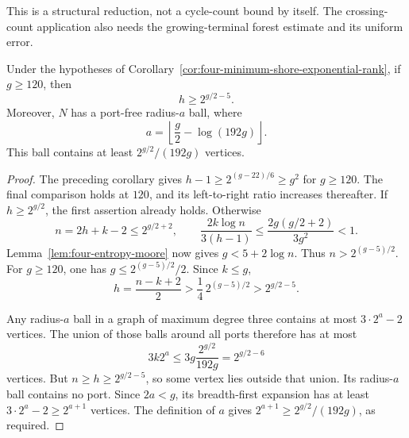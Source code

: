 This is a structural reduction, not a cycle-count bound by itself.
The crossing-count application also needs the growing-terminal forest estimate and its uniform error.

\begin{corollary}
\label{cor:four-near-moore-shore-rank}
Under the hypotheses of Corollary~\ref{cor:four-minimum-shore-exponential-rank}, if $g\ge120$, then
\[
 h\ge2^{g/2-5}.
\]
Moreover, $N$ has a port-free radius-$a$ ball, where
\[
 a=\left\lfloor\frac g2-\log(192g)\right\rfloor.
\]
This ball contains at least $2^{g/2}/(192g)$ vertices.
\end{corollary}

\begin{proof}
The preceding corollary gives $h-1\ge2^{(g-22)/6}\ge g^2$ for $g\ge120$.
The final comparison holds at $120$, and its left-to-right ratio increases thereafter.
If $h\ge2^{g/2}$, the first assertion already holds.
Otherwise
\[
 n=2h+k-2\le2^{g/2+2},\qquad
 \frac{2k\log n}{3(h-1)}
 \le\frac{2g(g/2+2)}{3g^2}<1.
\]
Lemma~\ref{lem:four-entropy-moore} now gives $g<5+2\log n$.
Thus $n>2^{(g-5)/2}$.
For $g\ge120$, one has $g\le2^{(g-5)/2}/2$.
Since $k\le g$,
\[
 h=\frac{n-k+2}{2}>\frac14\,2^{(g-5)/2}>2^{g/2-5}.
\]

Any radius-$a$ ball in a graph of maximum degree three contains at most $3\cdot2^a-2$ vertices.
The union of those balls around all ports therefore has at most
\[
 3k2^a\le3g\frac{2^{g/2}}{192g}=2^{g/2-6}
\]
vertices.
But $n\ge h\ge2^{g/2-5}$, so some vertex lies outside that union.
Its radius-$a$ ball contains no port.
Since $2a<g$, its breadth-first expansion has at least $3\cdot2^a-2\ge2^{a+1}$ vertices.
The definition of $a$ gives $2^{a+1}\ge2^{g/2}/(192g)$, as required.
\end{proof}
